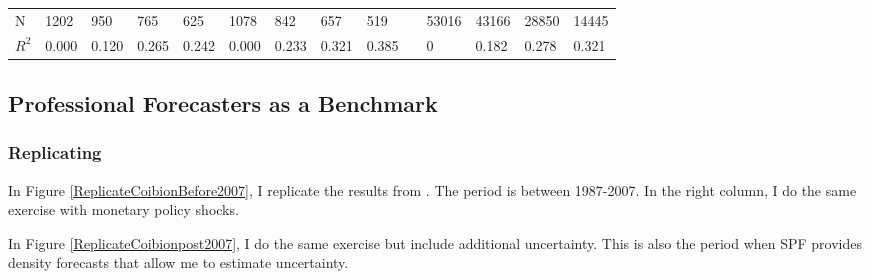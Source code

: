 \documentclass[]{article}
\begin{document}
\begin{adjustbox}{width={22cm},totalheight={12cm},angle=90}
\begin{tabular}{llllllllllllll}
		\hline 
		N                    & 1202        & 950       & 765       & 625       & 1078          & 842       & 657       & 519       &                      & 53016         & 43166     & 28850     & 14445     \\
		$R^2$ & 0.000       & 0.120     & 0.265     & 0.242     & 0.000         & 0.233     & 0.321     & 0.385     &                      & 0             & 0.182     & 0.278     & 0.321  \\
		\hline    
	\end{tabular}
\end{adjustbox}

\subsection{Professional Forecasters as a Benchmark}

\subsubsection{Replicating \cite{coibion2012can}}

In Figure \ref{ReplicateCoibionBefore2007}, I replicate the results from  \cite{coibion2012can}. The period is between 1987-2007.  In the right column, I do the same exercise with monetary policy shocks. 

In Figure \ref{ReplicateCoibionpost2007}, I do the same exercise but include additional uncertainty. This is also the period when SPF provides density forecasts that allow me to estimate uncertainty. 
\end{document}
